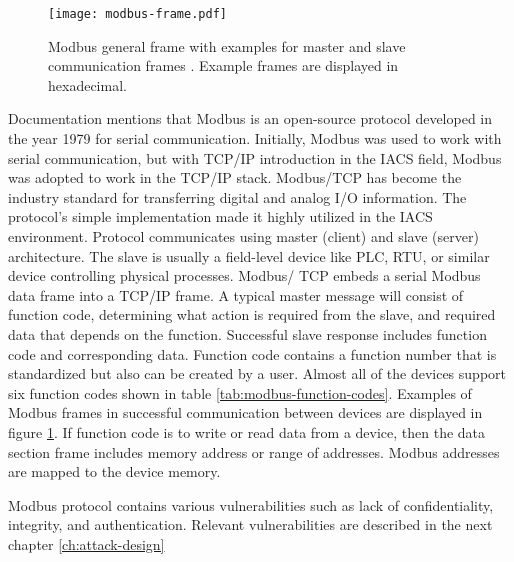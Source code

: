 \begin{figure}[H]
	\texttt{[image: modbus-frame.pdf]}
	\caption{Modbus general frame with examples for master and slave communication frames \parencite{WEB-21-modbus-main-page, WEB-22-modbus-rfc-doc}. Example frames are displayed in hexadecimal.}
	\label{fig:modbus-frame}
\end{figure}

Documentation \parencite{WEB-21-modbus-main-page, WEB-22-modbus-rfc-doc} mentions that Modbus is an open-source protocol developed in the year 1979 for serial communication. Initially, Modbus was used to work with serial communication, but with TCP/IP introduction in the IACS field, Modbus was adopted to work in the TCP/IP stack. Modbus/TCP has become the industry standard for transferring digital and analog I/O information. The protocol's simple implementation made it highly utilized in the IACS environment. Protocol communicates using master (client) and slave (server) architecture. The slave is usually a field-level device like PLC, RTU, or similar device controlling physical processes. Modbus/ TCP embeds a serial Modbus data frame into a TCP/IP frame. A typical master message will consist of function code, determining what action is required from the slave, and required data that depends on the function. Successful slave response includes function code and corresponding data. Function code contains a function number that is standardized but also can be created by a user. Almost all of the devices support six function codes shown in table \ref{tab:modbus-function-codes}.  Examples of Modbus frames in successful communication between devices are displayed in figure \ref{fig:modbus-frame}. If function code is to write or read data from a device, then the data section frame includes memory address or range of addresses. Modbus addresses are mapped to the device memory.

Modbus protocol contains various vulnerabilities such as lack of confidentiality, integrity, and authentication. Relevant vulnerabilities are described in the next chapter \ref{ch:attack-design}

